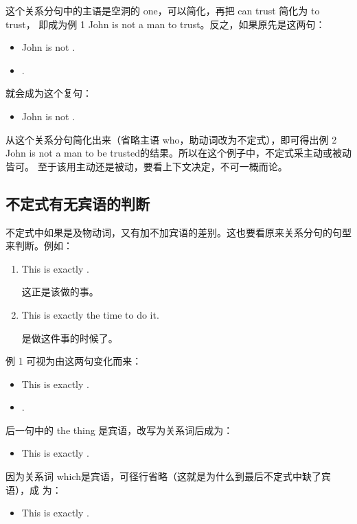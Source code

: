 这个关系分句中的主语是空洞的 one，可以简化，再把 can trust 简化为 to trust，
即成为例 1 John is not a man to trust。反之，如果原先是这两句：
\begin{itemize}
\item John is not .
\item {} .
\end{itemize}
就会成为这个复句：
\begin{itemize}
\item John is not  .
\end{itemize}
从这个关系分句简化出来（省略主语 who，助动词改为不定式），即可得出例 2 John
is not a man to be trusted的结果。所以在这个例子中，不定式采主动或被动皆可。
至于该用主动还是被动，要看上下文决定，不可一概而论。

\subsection{不定式有无宾语的判断}

不定式中如果是及物动词，又有加不加宾语的差别。这也要看原来关系分句的句型来判断。例如：
\begin{enumerate}
\item This is exactly  .

  这正是该做的事。
\item   This is exactly the time to do it.

  是做这件事的时候了。
\end{enumerate}

例 1 可视为由这两句变化而来：
\begin{itemize}
\item This is exactly .
\item {}  .
\end{itemize}
后一句中的 the thing 是宾语，改写为关系词后成为：
\begin{itemize}
\item This is exactly  .
\end{itemize}
因为关系词 which是宾语，可径行省略（这就是为什么到最后不定式中缺了宾语），成
为：
\begin{itemize}
\item This is exactly  .
\end{itemize}

